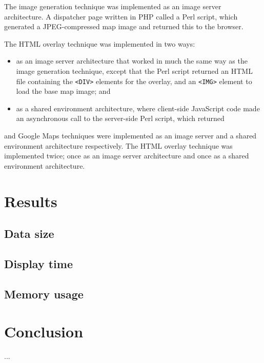 \documentclass[acmtocl,acmnow]{acmtrans2m}
\begin{document}
The image generation technique was implemented as an image server
architecture. A dispatcher page written in PHP called a Perl script,
which generated a JPEG-compressed map image and returned this to the
browser.

The HTML overlay technique was implemented in two ways:
\begin{itemize}

	\item as an image server architecture that worked in much the same way
	as the image generation technique, except that the Perl script
	returned an HTML file containing the \verb|<DIV>| elements for the
	overlay, and an \verb|<IMG>| element to load the base map image; and
	
	\item as a shared environment architecture, where client-side
	JavaScript code made an asynchronous call to the server-side Perl
	script, which returned

\end{itemize}

and Google Maps techniques were implemented as an image server and a
shared environment architecture respectively. The HTML overlay technique
was implemented twice; once as an image server architecture and once as
a shared environment architecture.


\section{Results}
\label{sec-results}


\subsection{Data size}


\subsection{Display time}


\subsection{Memory usage}


\section{Conclusion}








\begin{received}
...
\end{received}
\end{document}
